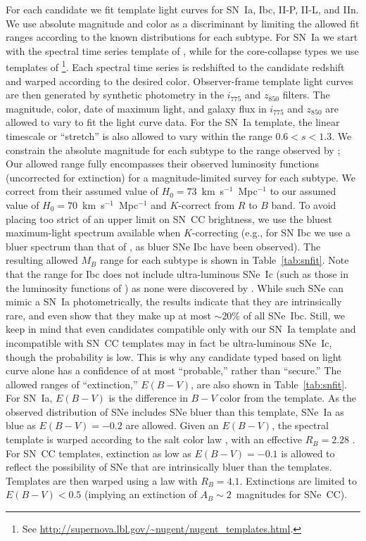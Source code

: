 For each candidate we fit template light curves for SN~Ia, Ibc, II-P,
II-L, and IIn. We use absolute magnitude and color as a discriminant
by limiting the allowed fit ranges according to the known
distributions for each subtype. For SN~Ia we start with the spectral
time series template of \citet{hsiao07a}, while for the core-collapse
types we use templates
of \citet{nugent02a}\footnote{See \url{http://supernova.lbl.gov/~nugent/nugent_templates.html}.}.
Each spectral time series is redshifted to the candidate redshift and
warped according to the desired color. Observer-frame template light
curves are then generated by synthetic photometry in the $i_{775}$ and
$z_{850}$ filters. The magnitude, color, date of maximum light, and
galaxy flux in $i_{775}$ and $z_{850}$ are allowed to vary to fit the
light curve data. For the SN~Ia template, the linear timescale or
``stretch'' \citep[e.g.,][]{perlmutter97a,guy05a} is also allowed to
vary within the range $0.6 < s < 1.3$.  We constrain the absolute
magnitude for each subtype to the range observed by \citet{li10a}; Our
allowed range fully encompasses their observed luminosity functions
(uncorrected for extinction) for a magnitude-limited survey for each
subtype. We correct from their assumed value of $H_0 =
73$~km~s$^{-1}$~Mpc$^{-1}$ to our assumed value of $H_0 =
70$~km~s$^{-1}$~Mpc$^{-1}$ and $K$-correct from $R$ to $B$ band. To
avoid placing too strict of an upper limit on SN~CC brightness, we use
the bluest maximum-light spectrum available when $K$-correcting (e.g.,
for SN Ibc we use a bluer spectrum than that of \citet{nugent02a}, as
bluer SNe Ibc have been observed). The resulting allowed $M_B$ range
for each subtype is shown in Table~\ref{tab:snfit}. Note that the
range for Ibc does not include ultra-luminous SNe~Ic (such as those in
the luminosity functions of \citet{richardson02a}) as none were
discovered by \citet{li10a}. While such SNe can mimic a SN~Ia
photometrically, the \citet{li10a} results indicate that they are
intrinsically rare, and even \citet{richardson02a} show that they make
up at most $\sim$20\% of all SNe~Ibc. Still, we keep in mind that even
candidates compatible only with our SN~Ia template and incompatible
with SN~CC templates may in fact be ultra-luminous SNe~Ic, though the
probability is low. This is why any candidate typed based on light
curve alone has a confidence of at most ``probable,'' rather than
``secure.''  The allowed ranges of ``extinction,'' $E(B-V)$, are also
shown in Table~\ref{tab:snfit}. For SN~Ia, $E(B-V)$ is the
difference in $B-V$ color from the \citet{hsiao07a} template. As the
observed distribution of SNe includes SNe
bluer than this template, SNe~Ia as blue as $E(B-V) = -0.2$ are
allowed. Given an $E(B-V)$, the spectral template is warped according
to the {\sc salt} color law \citep{guy05a}, with an effective $R_B =
2.28$ \citep{kowalski08a}. For SN~CC templates, extinction as low as
$E(B-V)=-0.1$ is allowed to reflect the possibility of SNe that are
intrinsically bluer than the \citet{nugent02a} templates. Templates
are then warped using a \citet{cardelli89a} law with $R_B =
4.1$. Extinctions are limited to $E(B-V) < 0.5$ (implying an
extinction of $A_B \sim 2$~magnitudes for SNe~CC).


